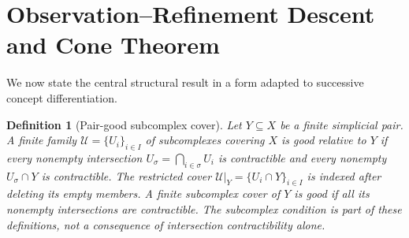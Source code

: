 \documentclass[11pt]{article}
\newtheorem{definition}[theorem]{Definition}
\begin{document}
\section{Observation--Refinement Descent and Cone Theorem}

We now state the central structural result in a form adapted to successive concept differentiation.

\begin{definition}[Pair-good subcomplex cover]
Let $Y\subseteq X$ be a finite simplicial pair.  A finite family
$\mathcal U=\{U_i\}_{i\in I}$ of subcomplexes covering $X$ is
\emph{good relative to $Y$} if every nonempty intersection
$U_\sigma=\bigcap_{i\in\sigma}U_i$ is contractible and every nonempty
$U_\sigma\cap Y$ is contractible.  The restricted cover
$\mathcal U|_Y=\{U_i\cap Y\}_{i\in I}$ is indexed after deleting its
empty members.  A finite subcomplex cover of $Y$ is \emph{good} if all
its nonempty intersections are contractible.  The subcomplex condition
is part of these definitions, not a consequence of intersection
contractibility alone.
\end{definition}
\end{document}
